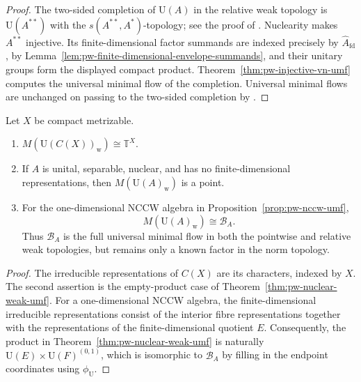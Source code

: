 \begin{proof}
The two-sided completion of \(\mathrm U(A)\) in the relative weak topology is
\(\mathrm U(A^{**})\) with the \(s(A^{**},A^*)\)-topology; see the proof of
\cite[Theorem~3.8]{GiordanoPestov2007}. Nuclearity makes \(A^{**}\) injective. Its
finite-dimensional factor summands are indexed precisely by
\(\widehat A_{\mathrm{fd}}\), by
Lemma~\ref{lem:pw-finite-dimensional-envelope-summands}, and their unitary groups
form the displayed compact product. Theorem~\ref{thm:pw-injective-vn-umf} computes the universal
minimal flow of the completion. Universal minimal flows are unchanged on
passing to the two-sided completion by \cite[Fact~2.3]{BassoZucker2021}.
\end{proof}

\begin{corollary}\label{cor:pw-nuclear-weak-examples}
Let \(X\) be compact metrizable.
\begin{enumerate}
\item
\(M(\mathrm U(C(X))_{\mathrm w})\cong\mathbb T^X\).
\item If \(A\) is unital, separable, nuclear, and has no finite-dimensional
representations, then \(M(\mathrm U(A)_{\mathrm w})\) is a point.
\item For the one-dimensional NCCW algebra in
Proposition~\ref{prop:pw-nccw-umf},
\[
M(\mathrm U(A)_{\mathrm w})\cong\mathcal B_A.
\]
Thus \(\mathcal B_A\) is the full universal minimal flow in both the
pointwise and relative weak topologies, but remains only a known factor in the
norm topology.
\end{enumerate}
\end{corollary}

\begin{proof}
The irreducible representations of \(C(X)\) are its characters, indexed by
\(X\). The second assertion is the empty-product case of
Theorem~\ref{thm:pw-nuclear-weak-umf}. For a one-dimensional NCCW algebra, the
finite-dimensional irreducible representations consist of the interior fibre
representations together with the representations of the finite-dimensional
quotient \(E\). Consequently, the product in
Theorem~\ref{thm:pw-nuclear-weak-umf} is naturally
\(\mathrm U(E)\times\mathrm U(F)^{(0,1)}\), which is isomorphic to
\(\mathcal B_A\) by filling in the endpoint coordinates using
\(\phi_{\mathrm U}\).
\end{proof}

